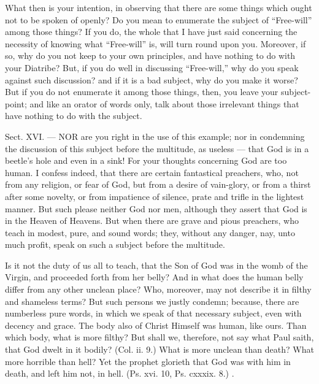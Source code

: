 What then is your intention, in observing that there are some things which ought not to be spoken of openly? Do you mean to enumerate the subject of “Free-will” among those things? If you do, the whole that I have just said concerning the necessity of knowing what “Free-will” is, will turn round upon you. Moreover, if so, why do you not keep to your own principles, and have nothing to do with your Diatribe? But, if you do well in discussing “Free-will,” why do you speak against such discussion? and if it is a bad subject, why do you make it worse? But if you do not enumerate it among those things, then, you leave your subject-point; and like an orator of words only, talk about those irrelevant things that have nothing to do with the subject.


Sect. XVI. — NOR are you right in the use of this example; nor in condemning the discussion of this subject before the multitude, as useless — that God is in a beetle’s hole and even in a sink! For your thoughts concerning God are too human. I confess indeed, that there are certain fantastical preachers, who, not from any religion, or fear of God, but from a desire of vain-glory, or from a thirst after some novelty, or from impatience of silence, prate and trifle in the lightest manner. But such please neither God nor men, although they assert that God is in the Heaven of Heavens. But when there are grave and pious preachers, who teach in modest, pure, and sound words; they, without any danger, nay, unto much profit, speak on such a subject before the multitude.

Is it not the duty of us all to teach, that the Son of God was in the womb of the Virgin, and proceeded forth from her belly? And in what does the human belly differ from any other unclean place? Who, moreover, may not describe it in filthy and shameless terms? But such persons we justly condemn; because, there are numberless pure words, in which we speak of that necessary subject, even with decency and grace. The body also of Christ Himself was human, like ours. Than which body, what is more filthy? But shall we, therefore, not say what Paul saith, that God dwelt in it bodily? (Col. ii. 9.) What is more unclean than death? What more horrible than hell? Yet the prophet glorieth that God was with him in death, and left him not, in hell. (Ps. xvi. 10, Ps. cxxxix. 8.) .

